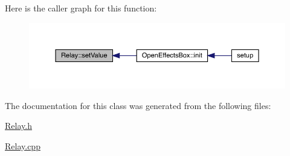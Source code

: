 Here is the caller graph for this function\+:\nopagebreak
\begin{figure}[H]
\begin{center}
\leavevmode
\includegraphics[width=350pt]{class_relay_ad503697efacdaeb980a9e580a3ae8def_icgraph}
\end{center}
\end{figure}


The documentation for this class was generated from the following files\+:\begin{DoxyCompactItemize}
\item 
\mbox{\hyperlink{_relay_8h}{Relay.\+h}}\item 
\mbox{\hyperlink{_relay_8cpp}{Relay.\+cpp}}\end{DoxyCompactItemize}
